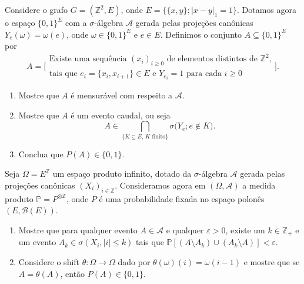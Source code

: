 

\begin{exercise}
  Considere o grafo $G = (\mathbb{Z}^2, E)$, onde $E = \big\{ \{x,y\}; |x - y|_1 = 1 \big\}$.
  Dotamos agora o espaço $\{0,1\}^E$ com a $\sigma$-álgebra $\mathcal{A}$ gerada pelas projeções canônicas $Y_e(\omega) = \omega(e)$, onde $\omega \in \{0,1\}^E$ e $e \in E$.
  Definimos o conjunto $A \subseteq \{0,1\}^E$ por
  \begin{equation}
    A = \Big[
    \begin{array}{c}
      \text{Existe uma sequência $(x_i)_{i\ge 0}$  de elementos distintos de $\mathbb{Z}^2$,}\\
      \text{tais que $e_i = \{x_i, x_{i+1}\} \in E$ e $Y_{e_i} = 1$ para cada $i \geq 0$}
    \end{array}
    \Big].
  \end{equation}
  \begin{enumerate}[\quad a)]
  \item Mostre que $A$ é mensurável com respeito a $\mathcal{A}$.
  \item Mostre que $A$ é um evento caudal, ou seja
    \begin{equation}
      A \in \bigcap_{\{K \subseteq E,\, K \text{ finito}\}} \sigma\big( Y_e; e \not \in K \big).
    \end{equation}
  \item Conclua que $P(A) \in \{0,1\}$.
  \end{enumerate}
\end{exercise}

\begin{exercise}
  Seja $\Omega = E^\mathbb{Z}$ um espaço produto infinito, dotado da $\sigma$-álgebra $\mathcal{A}$ gerada pelas projeções canônicas $(X_i)_{i \in \mathbb{Z}}$.
  Consideramos agora em $(\Omega, \mathcal{A})$ a medida produto $\mathbb{P} = P^{\otimes \mathbb{Z}}$, onde $P$ é uma probabilidade fixada no espaço polonês $(E, \mathcal{B}(E))$.
  \begin{enumerate}[\quad a)]
  \item Mostre que para qualquer evento $A \in \mathcal{A}$ e qualquer $\varepsilon > 0$, existe um $k \in \mathbb{Z}_+$ e um evento $A_k \in \sigma(X_i, |i| \leq k)$ tais que $\mathbb{P}[(A \setminus A_k) \cup (A_k \setminus A)] < \varepsilon$.
  \item Considere o shift $\theta:\Omega \to \Omega$ dado por $\theta(\omega)(i) = \omega(i-1)$ e mostre que se $A = \theta(A)$, então $P(A) \in \{0,1\}$.
  \end{enumerate}
\end{exercise}

